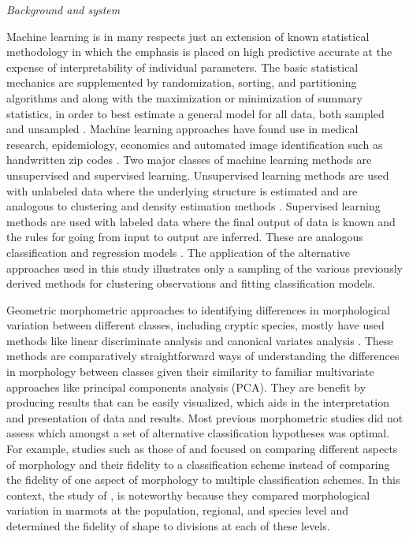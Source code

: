 \documentclass[12pt,letterpaper]{article}
\renewcommand{\subsection}[1]{%
\bigskip
\begin{center}
\begin{large}
\normalfont\itshape #1
\end{large}
\end{center}}
\begin{document}
\subsection{Background and system}
Machine learning is in many respects just an extension of known statistical methodology \citep{Hastie2009} in which the emphasis is placed on high predictive accurate at the expense of interpretability of individual parameters. The basic statistical mechanics are supplemented by randomization, sorting, and partitioning algorithms and along with the maximization or minimization of summary statistics, in order to best estimate a general model for all data, both sampled and unsampled \citep{Hastie2009}. Machine learning approaches have found use in medical research, epidemiology, economics and automated image identification such as handwritten zip codes \citep{Hastie2009}. Two major classes of machine learning methods are unsupervised and supervised learning. Unsupervised learning methods are used with unlabeled data where the underlying structure is estimated and are analogous to clustering and density estimation methods \citep{Kaufman1990}. Supervised learning methods are used with labeled data where the final output of data is known and the rules for going from input to output are inferred. These are analogous classification and regression models \citep{Breiman1984}. The application of the alternative approaches used in this study illustrates only a sampling of the various previously derived methods for clustering observations and fitting classification models. 

Geometric morphometric approaches to identifying differences in morphological variation between different classes, including cryptic species, mostly have used methods like linear discriminate analysis and canonical variates analysis \citep{Zelditch2004,Mitteroecker2011,Polly2007a,Polly2003,Gunduz2007,Gaubert2005b,Demandt2009,Sztencel-Jabonka2009,MitrovskiBogdanovic2013,Francoy2009}. These methods are comparatively straightforward ways of understanding the differences in morphology between classes given their similarity to familiar multivariate approaches like principal components analysis (PCA). They are benefit by producing results that can be easily visualized, which aids in the interpretation and presentation of data and results. Most previous morphometric studies did not assess which amongst a set of alternative classification hypotheses was optimal. For example, studies such as those of \citet{Caumul2005a} and \citet{Polly2007a} focused on comparing different aspects of morphology and their fidelity to a classification scheme instead of comparing the fidelity of one aspect of morphology to multiple classification schemes. In this context, the study of \citet{Cardini2009a}, is noteworthy because they compared morphological variation in marmots at the population, regional, and species level and determined the fidelity of shape to divisions at each of these levels.
\end{document}
